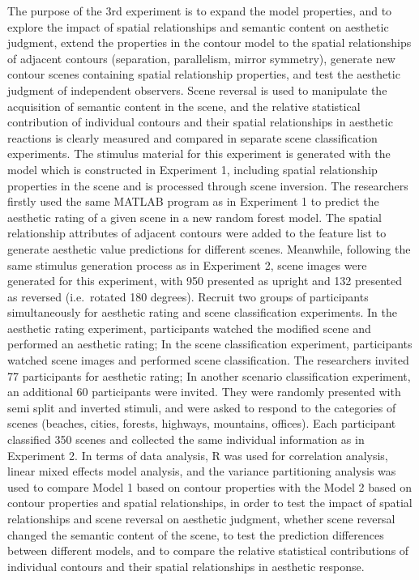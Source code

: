 \documentclass[
  man,floatsintext]{apa6}
\begin{document}
The purpose of the 3rd experiment is to expand the model properties, and to explore the impact of spatial relationships and semantic content on aesthetic judgment, extend the properties in the contour model to the spatial relationships of adjacent contours (separation, parallelism, mirror symmetry), generate new contour scenes containing spatial relationship properties, and test the aesthetic judgment of independent observers. Scene reversal is used to manipulate the acquisition of semantic content in the scene, and the relative statistical contribution of individual contours and their spatial relationships in aesthetic reactions is clearly measured and compared in separate scene classification experiments. The stimulus material for this experiment is generated with the model which is constructed in Experiment 1, including spatial relationship properties in the scene and is processed through scene inversion. The researchers firstly used the same MATLAB program as in Experiment 1 to predict the aesthetic rating of a given scene in a new random forest model. The spatial relationship attributes of adjacent contours were added to the feature list to generate aesthetic value predictions for different scenes. Meanwhile, following the same stimulus generation process as in Experiment 2, scene images were generated for this experiment, with 950 presented as upright and 132 presented as reversed (i.e.~rotated 180 degrees). Recruit two groups of participants simultaneously for aesthetic rating and scene classification experiments. In the aesthetic rating experiment, participants watched the modified scene and performed an aesthetic rating; In the scene classification experiment, participants watched scene images and performed scene classification. The researchers invited 77 participants for aesthetic rating; In another scenario classification experiment, an additional 60 participants were invited. They were randomly presented with semi split and inverted stimuli, and were asked to respond to the categories of scenes (beaches, cities, forests, highways, mountains, offices). Each participant classified 350 scenes and collected the same individual information as in Experiment 2. In terms of data analysis, R was used for correlation analysis, linear mixed effects model analysis, and the variance partitioning analysis was used to compare Model 1 based on contour properties with the Model 2 based on contour properties and spatial relationships, in order to test the impact of spatial relationships and scene reversal on aesthetic judgment, whether scene reversal changed the semantic content of the scene, to test the prediction differences between different models, and to compare the relative statistical contributions of individual contours and their spatial relationships in aesthetic response.
\end{document}
